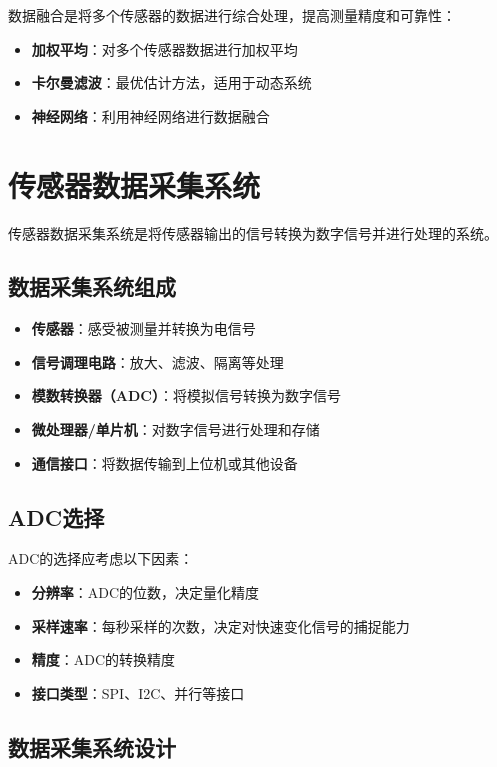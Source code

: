 \documentclass[12pt,UTF8]{ctexbook}
\begin{document}
数据融合是将多个传感器的数据进行综合处理，提高测量精度和可靠性：

\begin{itemize}[leftmargin=2cm]
	\item \textbf{加权平均}：对多个传感器数据进行加权平均
	\item \textbf{卡尔曼滤波}：最优估计方法，适用于动态系统
	\item \textbf{神经网络}：利用神经网络进行数据融合
\end{itemize}

\section{传感器数据采集系统}

传感器数据采集系统是将传感器输出的信号转换为数字信号并进行处理的系统。

\subsection{数据采集系统组成}

\begin{itemize}[leftmargin=2cm]
	\item \textbf{传感器}：感受被测量并转换为电信号
	\item \textbf{信号调理电路}：放大、滤波、隔离等处理
	\item \textbf{模数转换器（ADC）}：将模拟信号转换为数字信号
	\item \textbf{微处理器/单片机}：对数字信号进行处理和存储
	\item \textbf{通信接口}：将数据传输到上位机或其他设备
\end{itemize}

\subsection{ADC选择}

ADC的选择应考虑以下因素：

\begin{itemize}[leftmargin=2cm]
	\item \textbf{分辨率}：ADC的位数，决定量化精度
	\item \textbf{采样速率}：每秒采样的次数，决定对快速变化信号的捕捉能力
	\item \textbf{精度}：ADC的转换精度
	\item \textbf{接口类型}：SPI、I2C、并行等接口
\end{itemize}

\subsection{数据采集系统设计}
\end{document}
